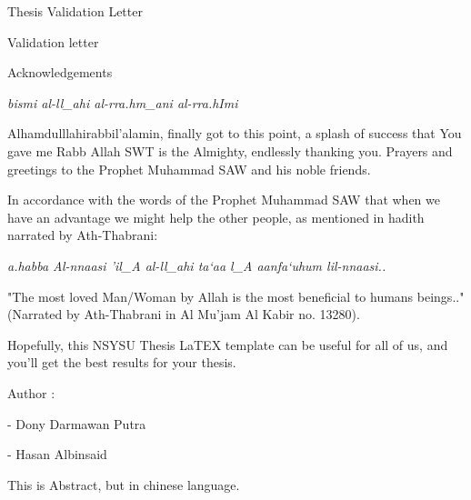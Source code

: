 \documentclass[12pt, twoside , openright]{book}
\begin{document}
\begin{center}
	{\chinnesesize Thesis Validation Letter }
\end{center}
Validation letter
\newpage
\mbox{}
\newpage


{}
\begin{center}
	{\chinnesesize Acknowledgements}
\end{center}
\begin{center}
	\textit{bismi al-ll\_ahi al-rra.hm\_ani al-rra.hImi}
\end{center}

Alhamdulllahirabbil'alamin, finally got to this point, a splash of success that You gave me Rabb Allah SWT is the Almighty, endlessly thanking you. Prayers and greetings to the Prophet Muhammad SAW and his noble friends.  

In accordance with the words of the Prophet Muhammad SAW that when we have an advantage we might help the other people, as mentioned in hadith narrated by Ath-Thabrani:

\begin{center}
	\textit{a.habba Al-nnaasi 'il\_A al-ll\_ahi ta`aa l\_A aanfa`uhum lil-nnaasi..}
\end{center}


"The most loved Man/Woman by Allah is the most beneficial to humans  beings.." (Narrated by Ath-Thabrani in Al Mu'jam Al Kabir no. 13280).

Hopefully, this NSYSU Thesis LaTEX template can be useful for all of us, and you'll get the best results for your thesis.

\noindent
Author :

\vspace{-2em}
- Dony Darmawan Putra

\vspace{-2em}
- Hasan Albinsaid

\newpage
\mbox{}
\newpage





{}
\begin{center}
	{\chinnesesize {}}
\end{center}
This is Abstract, but in chinese language. \blindtext[1]
\newpage
\mbox{}
\newpage
\end{document}
